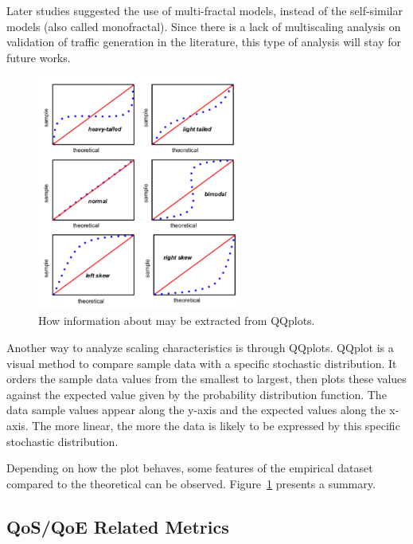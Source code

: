 Later studies suggested the use of multi-fractal models, instead of the self-similar models (also called monofractal)\cite{validate-trafficgen}\cite{udp-flows-model}. Since there is a lack of multiscaling analysis on validation of traffic generation in the literature, this type of analysis will stay for future works.

\begin{figure}[ht!]
	\centering
	\includegraphics[width=0.6\textwidth]{figures/ch2/qqplot-tutorial}
	\caption{ How information about may be extracted from QQplots.}
	\label{fig:qqplot-tutorial}
\end{figure}


Another way to analyze scaling characteristics is through QQplots. \acrfull{QQplot} is a visual method to compare sample data with a specific stochastic distribution. It orders the sample data values from the smallest to largest, then plots these values against the expected value given by the probability distribution function. The data sample values appear along the y-axis and the expected values along the x-axis. The more linear, the more the data is likely to be expressed by this specific stochastic distribution. 

Depending on how the plot behaves, some features of the empirical dataset compared to the theoretical can be observed. Figure~\ref{fig:qqplot-tutorial} presents a summary.


\subsection{QoS/QoE Related Metrics}


